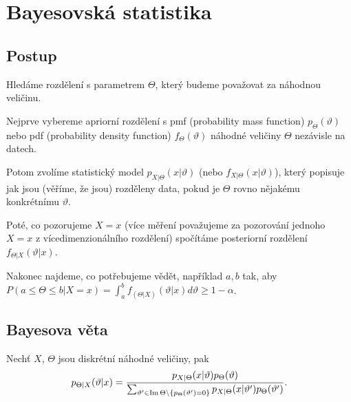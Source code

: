 \documentclass[12pt]{article}					%
\begin{document}
\section{Bayesovská statistika}

\subsection{Postup}

\begin{definice}
	Hledáme rozdělení s parametrem $\Theta$, který budeme považovat za náhodnou veličinu.
\end{definice}

\begin{definice}
	Nejprve vybereme apriorní rozdělení s pmf (probability mass function) $p_\Theta(\vartheta)$ nebo pdf (probability density function) $f_\Theta(\vartheta)$ náhodné veličiny $\Theta$ nezávisle na datech.
\end{definice}

\begin{definice}
	Potom zvolíme statistický model $p_{X|\Theta}(x|\vartheta)$ (nebo $f_{X|\Theta}(x|\vartheta)$), který popisuje jak jsou (věříme, že jsou) rozděleny data, pokud je $\Theta$ rovno nějakému konkrétnímu $\vartheta$.
\end{definice}

\begin{definice}
	Poté, co pozorujeme $X = x$ (více měření považujeme za pozorování jednoho $X = x$ z vícedimenzionálního rozdělení) spočítáme posteriorní rozdělení $f_{\Theta | X}(\vartheta | x)$.
\end{definice}

\begin{poznamka}
	Nakonec najdeme, co potřebujeme vědět, například $a, b$ tak, aby $P(a ≤ \Theta ≤ b | X = x) = \int_a^b f_{(\Theta | X)}(\vartheta | x) d\vartheta ≥ 1 - \alpha$.
\end{poznamka}

\subsection{Bayesova věta}

\begin{veta}
	Nechť $X$, $\Theta$ jsou diskrétní náhodné veličiny, pak
	$$ p_{\Theta | X}(\vartheta | x) = \frac{p_{X|\Theta}(x|\vartheta) p_\Theta(\vartheta)}{\sum_{\vartheta' \in \operatorname{Im} \Theta \setminus \{p_\Theta(\vartheta') = 0\}} p_{X|\Theta}(x|\vartheta')p_\Theta(\vartheta')}. $$
\end{veta}
\end{document}
